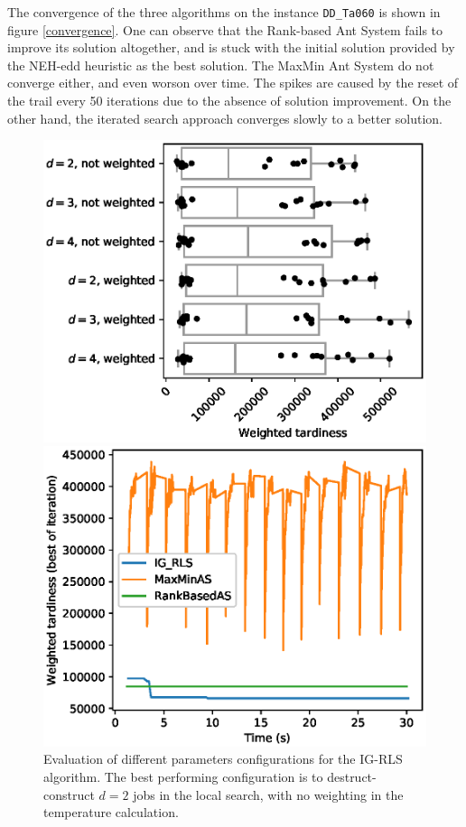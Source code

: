 \documentclass[runningheads]{llncs}
\begin{document}
The convergence of the three algorithms on the instance \texttt{DD\_Ta060} is
shown in figure \ref{convergence}. One can observe that the Rank-based Ant
System fails to improve its solution altogether, and is stuck with the initial
solution provided by the NEH-edd heuristic as the best solution. The MaxMin Ant
System do not converge either, and even worson over time. The spikes are caused
by the reset of the trail every 50 iterations due to the absence of solution
improvement. On the other hand, the iterated search approach converges slowly
to a better solution.

\begin{figure}
    \centering
    \begin{minipage}{.48\textwidth}
		\centering
		\includegraphics[width=1.1\textwidth]{IG_RLS-params.eps}
		\caption{Evaluation of different parameters configurations for the
		IG-RLS algorithm. The best performing configuration is to
		destruct-construct $d=2$ jobs in the local search, with no weighting in
		the temperature calculation.}
		\label{IG_RLS-params}
    \end{minipage}
    \hspace{0.02\textwidth}
    \begin{minipage}{.48\textwidth}
		\centering
		\includegraphics[width=1.1\textwidth]{DD_Ta060-convergence.eps}

\end{minipage}
\end{figure}
\end{document}
